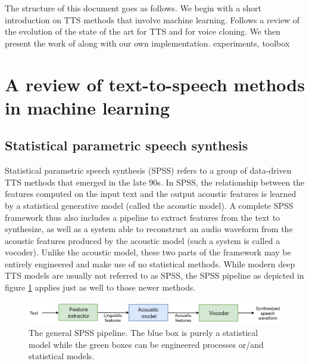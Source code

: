 \documentclass[a4paper, oneside, 12pt, english]{article}
\begin{document}
The structure of this document goes as follows. We begin with a short introduction on TTS methods that involve machine learning. Follows a review of the evolution of the state of the art for TTS and for voice cloning. We then present the work of \citep{SV2TTS} along with our own implementation. \color{red} experiments, toolbox \color{black}


\section{A review of text-to-speech methods in machine learning}
\subsection{Statistical parametric speech synthesis}
Statistical parametric speech synthesis (SPSS) refers to a group of data-driven TTS methods that emerged in the late 90s. In SPSS, the relationship between the features computed on the input text and the output acoustic features is learned by a statistical generative model (called the acoustic model). A complete SPSS framework thus also includes a pipeline to extract features from the text to synthesize, as well as a system able to reconstruct an audio waveform from the acoustic features produced by the acoustic model (such a system is called a vocoder). Unlike the acoustic model, these two parts of the framework may be entirely engineered and make use of no statistical methods. While modern deep TTS models are usually not referred to as SPSS, the SPSS pipeline as depicted in figure \ref{spss_framework} applies just as well to those newer methods.

\begin{figure}[h]
	\centering
	\includegraphics[width=\linewidth]{images/spss_framework.png}
	\caption{The general SPSS pipeline. The blue box is purely a statistical model while the green boxes can be engineered processes or/and statistical models.}
	\label{spss_framework}
\end{figure}
\end{document}
